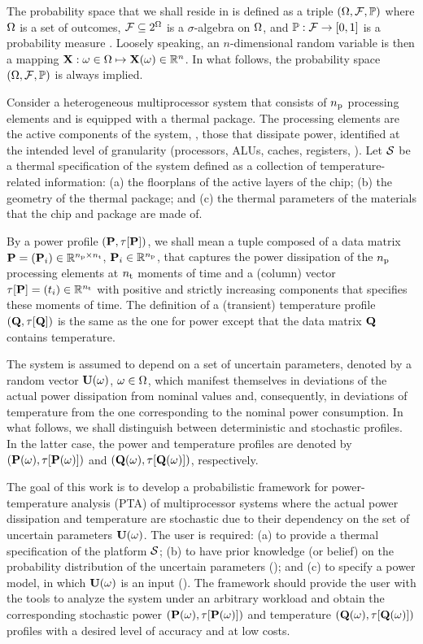 
The probability space that we shall reside in is defined as a triple $(\Omega, \mathcal{F}, \mathbb{P})$ where $\Omega$ is a set of outcomes, $\mathcal{F} \subseteq 2^\Omega$ is a $\sigma$-algebra on $\Omega$, and $\mathbb{P}: \mathcal{F} \to [0, 1]$ is a probability measure \cite{maitre2010}.
Loosely speaking, an $n$-dimensional random variable is then a mapping $\mathbf{X}: \omega \in \Omega \mapsto \mathbf{X}(\omega) \in \mathbb{R}^n$.
In what follows, the probability space $(\Omega, \mathcal{F}, \mathbb{P})$ is always implied.

Consider a heterogeneous multiprocessor system that consists of ${n_\text{p}}$ processing elements and is equipped with a thermal package.
The processing elements are the active components of the system, \ie, those that dissipate power, identified at the intended level of granularity (processors, ALUs, caches, registers, \etc).
Let $\mathcal{S}$ be a thermal specification of the system defined as a collection of temperature-related information: (a) the floorplans of the active layers of the chip; (b) the geometry of the thermal package; and (c) the thermal parameters of the materials that the chip and package are made of.

By a power profile $\profileP$, we shall mean a tuple composed of a data matrix $\mP = (\vP_i) \in \real^{\nprocs \times \nsteps}$, $\mathbf{P}_i \in \mathbb{R}^{n_\text{p}}$, that captures the power dissipation of the ${n_\text{p}}$ processing elements at ${n_\text{t}}$ moments of time and a (column) vector $\partition{\mP} = (\t_i) \in \real^{\nsteps}$ with positive and strictly increasing components that specifies these moments of time.
The definition of a (transient) temperature profile $\profileT$ is the same as the one for power except that the data matrix $\mTO$ contains temperature.

The system is assumed to depend on a set of uncertain parameters, denoted by a random vector $\mathbf{U}(\omega)$, $\omega \in \Omega$, which manifest themselves in deviations of the actual power dissipation from nominal values and, consequently, in deviations of temperature from the one corresponding to the nominal power consumption.
In what follows, we shall distinguish between deterministic and stochastic profiles.
In the latter case, the power and temperature profiles are denoted by $\profileP{\o}$ and $\profileT{\o}$, respectively.

The goal of this work is to develop a probabilistic framework for power-temperature analysis (PTA) of multiprocessor systems where the actual power dissipation and temperature are stochastic due to their dependency on the set of uncertain parameters $\mathbf{U}(\omega)$.
The user is required: (a) to provide a thermal specification of the platform $\mathcal{S}$; (b) to have prior knowledge (or belief) on the probability distribution of the uncertain parameters (); and (c) to specify a power model, in which $\mathbf{U}(\omega)$ is an input ().
The framework should provide the user with the tools to analyze the system under an arbitrary workload and obtain the corresponding stochastic power $\profileP{\o}$ and temperature $\profileT{\o}$ profiles with a desired level of accuracy and at low costs.

